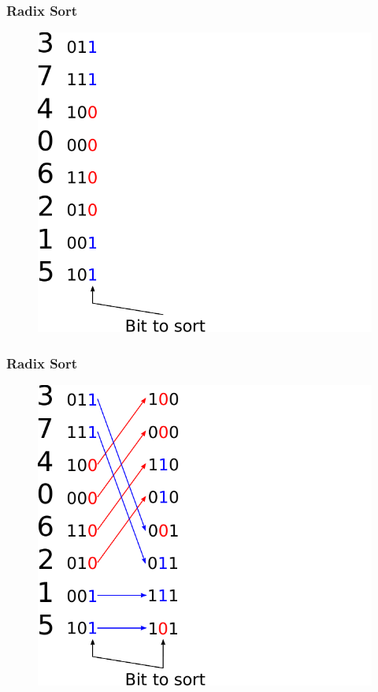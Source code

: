 \documentclass[aspectratio=169,handout]{beamer}
\begin{document}
\frame
{
	\frametitle{Radix Sort}
	\begin{figure}
		\centering
		\includegraphics[height=0.7\textheight]{radix0}
	\end{figure}
}

\frame
{
	\frametitle{Radix Sort}
	\begin{figure}
		\centering
		\includegraphics[height=0.7\textheight]{radix1}
	\end{figure}
}
\end{document}
